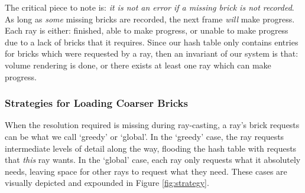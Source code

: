 The critical piece to note is: \emph{it is not an error if a
missing brick is not recorded}.  As long as \emph{some}
missing bricks are recorded, the next frame \emph{will} make progress.
Each ray is either: finished, able to make progress, or unable to make
progress due to a lack of bricks that it requires.  Since our hash
table only contains entries for bricks which were requested by a ray,
then an invariant of our system is that: volume rendering is done, or
there exists at least one ray which can make progress.


%

\subsubsection{Strategies for Loading Coarser Bricks}

When the resolution required is missing during ray-casting, a ray's
brick requests can be what we call `greedy' or `global'.  In the
`greedy' case, the ray requests intermediate levels of detail along the
way, flooding the hash table with
requests that \textit{this} ray wants.  In the `global' case, each
ray only requests what it absolutely needs, leaving space for other
rays to request what they need.  These cases are visually depicted and
expounded in Figure
\ref{fig:strategy}.

